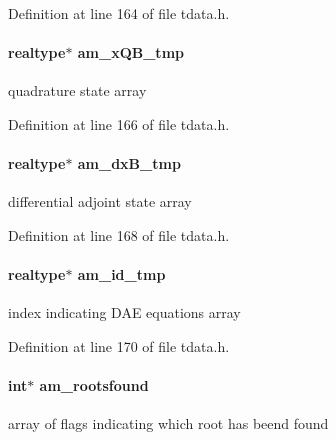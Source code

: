 Definition at line 164 of file tdata.\+h.

\hypertarget{struct_temp_data_a18e2184588648670c2df22856f441e32}{}
\paragraph[{am\+\_\+x\+Q\+B\+\_\+tmp}]{\setlength{\rightskip}{0pt plus 5cm}realtype$\ast$ am\+\_\+x\+Q\+B\+\_\+tmp}\label{struct_temp_data_a18e2184588648670c2df22856f441e32}
quadrature state array 

Definition at line 166 of file tdata.\+h.

\hypertarget{struct_temp_data_a147fbb5ac85bc9ce0f55cb9108663e1b}{}
\paragraph[{am\+\_\+dx\+B\+\_\+tmp}]{\setlength{\rightskip}{0pt plus 5cm}realtype$\ast$ am\+\_\+dx\+B\+\_\+tmp}\label{struct_temp_data_a147fbb5ac85bc9ce0f55cb9108663e1b}
differential adjoint state array 

Definition at line 168 of file tdata.\+h.

\hypertarget{struct_temp_data_af4cb4bb8ec3396d46cca992ad83ae137}{}
\paragraph[{am\+\_\+id\+\_\+tmp}]{\setlength{\rightskip}{0pt plus 5cm}realtype$\ast$ am\+\_\+id\+\_\+tmp}\label{struct_temp_data_af4cb4bb8ec3396d46cca992ad83ae137}
index indicating D\+A\+E equations array 

Definition at line 170 of file tdata.\+h.

\hypertarget{struct_temp_data_a7aead84117fd84087a23d968ea56b542}{}
\paragraph[{am\+\_\+rootsfound}]{\setlength{\rightskip}{0pt plus 5cm}int$\ast$ am\+\_\+rootsfound}\label{struct_temp_data_a7aead84117fd84087a23d968ea56b542}
array of flags indicating which root has beend found

